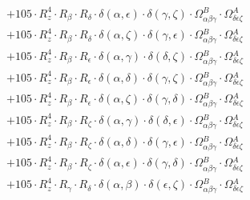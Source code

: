 \documentclass{article}
\begin{document}
\begin{equation}
\begin{array}{c}
 \\[0.2em] 		 + 105 \cdot R_{z}^{4} \cdot R_{\beta{}} \cdot R_{\delta{}} \cdot \delta{}\left(\alpha{}, \epsilon{}\right) \cdot \delta{}\left(\gamma{}, \zeta{}\right) \cdot \Omega{}^{B}_{\alpha{}\beta{}\gamma{}} \cdot \Omega{}^{A}_{\delta{}\epsilon{}\zeta{}} 
 \\[0.2em] 		 + 105 \cdot R_{z}^{4} \cdot R_{\beta{}} \cdot R_{\delta{}} \cdot \delta{}\left(\alpha{}, \zeta{}\right) \cdot \delta{}\left(\gamma{}, \epsilon{}\right) \cdot \Omega{}^{B}_{\alpha{}\beta{}\gamma{}} \cdot \Omega{}^{A}_{\delta{}\epsilon{}\zeta{}} 
 \\[0.2em] 		 + 105 \cdot R_{z}^{4} \cdot R_{\beta{}} \cdot R_{\epsilon{}} \cdot \delta{}\left(\alpha{}, \gamma{}\right) \cdot \delta{}\left(\delta{}, \zeta{}\right) \cdot \Omega{}^{B}_{\alpha{}\beta{}\gamma{}} \cdot \Omega{}^{A}_{\delta{}\epsilon{}\zeta{}} 
 \\[0.2em] 		 + 105 \cdot R_{z}^{4} \cdot R_{\beta{}} \cdot R_{\epsilon{}} \cdot \delta{}\left(\alpha{}, \delta{}\right) \cdot \delta{}\left(\gamma{}, \zeta{}\right) \cdot \Omega{}^{B}_{\alpha{}\beta{}\gamma{}} \cdot \Omega{}^{A}_{\delta{}\epsilon{}\zeta{}} 
 \\[0.2em] 		 + 105 \cdot R_{z}^{4} \cdot R_{\beta{}} \cdot R_{\epsilon{}} \cdot \delta{}\left(\alpha{}, \zeta{}\right) \cdot \delta{}\left(\gamma{}, \delta{}\right) \cdot \Omega{}^{B}_{\alpha{}\beta{}\gamma{}} \cdot \Omega{}^{A}_{\delta{}\epsilon{}\zeta{}} 
 \\[0.2em] 		 + 105 \cdot R_{z}^{4} \cdot R_{\beta{}} \cdot R_{\zeta{}} \cdot \delta{}\left(\alpha{}, \gamma{}\right) \cdot \delta{}\left(\delta{}, \epsilon{}\right) \cdot \Omega{}^{B}_{\alpha{}\beta{}\gamma{}} \cdot \Omega{}^{A}_{\delta{}\epsilon{}\zeta{}} 
 \\[0.2em] 		 + 105 \cdot R_{z}^{4} \cdot R_{\beta{}} \cdot R_{\zeta{}} \cdot \delta{}\left(\alpha{}, \delta{}\right) \cdot \delta{}\left(\gamma{}, \epsilon{}\right) \cdot \Omega{}^{B}_{\alpha{}\beta{}\gamma{}} \cdot \Omega{}^{A}_{\delta{}\epsilon{}\zeta{}} 
 \\[0.2em] 		 + 105 \cdot R_{z}^{4} \cdot R_{\beta{}} \cdot R_{\zeta{}} \cdot \delta{}\left(\alpha{}, \epsilon{}\right) \cdot \delta{}\left(\gamma{}, \delta{}\right) \cdot \Omega{}^{B}_{\alpha{}\beta{}\gamma{}} \cdot \Omega{}^{A}_{\delta{}\epsilon{}\zeta{}} 
 \\[0.2em] 		 + 105 \cdot R_{z}^{4} \cdot R_{\gamma{}} \cdot R_{\delta{}} \cdot \delta{}\left(\alpha{}, \beta{}\right) \cdot \delta{}\left(\epsilon{}, \zeta{}\right) \cdot \Omega{}^{B}_{\alpha{}\beta{}\gamma{}} \cdot \Omega{}^{A}_{\delta{}\epsilon{}\zeta{}} 

\end{array}
\end{equation}
\end{document}
